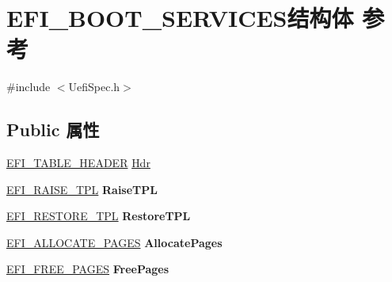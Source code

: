 \hypertarget{struct_e_f_i___b_o_o_t___s_e_r_v_i_c_e_s}{}\section{E\+F\+I\+\_\+\+B\+O\+O\+T\+\_\+\+S\+E\+R\+V\+I\+C\+E\+S结构体 参考}
\label{struct_e_f_i___b_o_o_t___s_e_r_v_i_c_e_s}


{\ttfamily \#include $<$Uefi\+Spec.\+h$>$}

\subsection*{Public 属性}
\begin{DoxyCompactItemize}
\item 
\hyperlink{struct_e_f_i___t_a_b_l_e___h_e_a_d_e_r}{E\+F\+I\+\_\+\+T\+A\+B\+L\+E\+\_\+\+H\+E\+A\+D\+ER} \hyperlink{struct_e_f_i___b_o_o_t___s_e_r_v_i_c_e_s_a7a3c499784457ac6130feb038a9ddf5b}{Hdr}
\item 
\mbox{\label{struct_e_f_i___b_o_o_t___s_e_r_v_i_c_e_s_aafae14807c6c9b5e1d90d19f4ba1b1d3}} 
\hyperlink{_uefi_spec_8h_a9c98857dbe256d29b4000e160e108183}{E\+F\+I\+\_\+\+R\+A\+I\+S\+E\+\_\+\+T\+PL} {\bfseries Raise\+T\+PL}
\item 
\mbox{\label{struct_e_f_i___b_o_o_t___s_e_r_v_i_c_e_s_a0743b4cfce2dc43edd8355e67adadc5a}} 
\hyperlink{_uefi_spec_8h_a42cf8d8d2257acf2891a645ac7c280c3}{E\+F\+I\+\_\+\+R\+E\+S\+T\+O\+R\+E\+\_\+\+T\+PL} {\bfseries Restore\+T\+PL}
\item 
\mbox{\label{struct_e_f_i___b_o_o_t___s_e_r_v_i_c_e_s_a0270b61cef6a165c2472d906f69df543}} 
\hyperlink{_uefi_spec_8h_ad33a8459d6a44da25d810961ff655326}{E\+F\+I\+\_\+\+A\+L\+L\+O\+C\+A\+T\+E\+\_\+\+P\+A\+G\+ES} {\bfseries Allocate\+Pages}
\item 
\mbox{\label{struct_e_f_i___b_o_o_t___s_e_r_v_i_c_e_s_a61fe296ce05d84cd9b9b5804dc25e77a}} 
\hyperlink{_uefi_spec_8h_ab92f9ee50909bee85d7d8a250d8c1dd3}{E\+F\+I\+\_\+\+F\+R\+E\+E\+\_\+\+P\+A\+G\+ES} {\bfseries Free\+Pages}
\item 
\mbox{\label{struct_e_f_i___b_o_o_t___s_e_r_v_i_c_e_s_ac2694db09258bd684a07e08f5248c421}} 

\end{DoxyCompactItemize}
